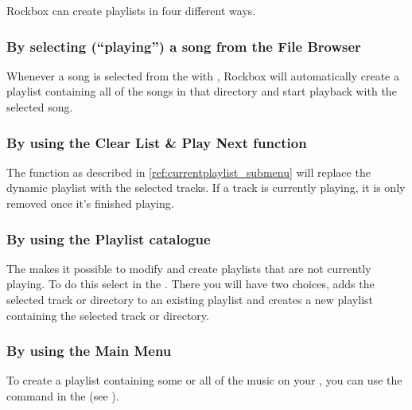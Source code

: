 Rockbox can create playlists in four different ways.

\subsubsection{By selecting (``playing'') a song from the File Browser}
Whenever a song is selected from the  with
\ActionTreeEnter, Rockbox will automatically create a playlist containing
all of the songs in that directory and start playback with the selected
song.


\subsubsection{By using the Clear List \& Play Next function}
The  function as described in
\ref{ref:currentplaylist_submenu} will replace the dynamic playlist with the selected
tracks. If a track is currently playing, it is only removed once it’s finished
playing.

\subsubsection{\label{ref:playlist_catalogue}By using the Playlist catalogue}
The  makes it possible to modify and create
playlists that are not currently playing. To do this select  in the . There you will have two choices,
 adds the selected track or directory to an existing
playlist and  creates a new playlist containing
the selected track or directory.


\subsubsection{By using the Main Menu}
To create a playlist containing some or all of the music on your \dap{}, you can use the
 command in the 
(see ).


